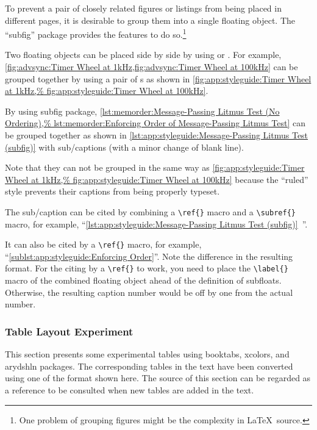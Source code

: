 To prevent a pair of closely related figures or listings
from being placed in different pages, it is desirable to group
them into a single floating object.
The ``subfig'' package provides the features to do so.\footnote{
  One problem of grouping figures might be the complexity in
  \LaTeX\ source.}

Two floating objects can be placed side by side by using
\co{\\parbox} or .
For example,
\cref{fig:advsync:Timer Wheel at 1kHz,fig:advsync:Timer Wheel at 100kHz}
can be grouped together by using a pair of s
as shown in
\cref{fig:app:styleguide:Timer Wheel at 1kHz,%
fig:app:styleguide:Timer Wheel at 100kHz}.

By using subfig package,
\cref{lst:memorder:Message-Passing Litmus Test (No Ordering),%
lst:memorder:Enforcing Order of Message-Passing Litmus Test}
can be grouped together as shown in
\cref{lst:app:styleguide:Message-Passing Litmus Test (subfig)}
with sub\-/captions (with a minor change of blank line).

Note that they can not be grouped in the same way as
\cref{fig:app:styleguide:Timer Wheel at 1kHz,%
fig:app:styleguide:Timer Wheel at 100kHz}
because the ``ruled'' style prevents their captions
from being properly typeset.

The sub\-/caption can be cited by combining a \verb|\ref{}| macro
and a \verb|\subref{}| macro, for example,
``\cref{lst:app:styleguide:Message-Passing Litmus Test (subfig)}\,%
''.

It can also be cited by a \verb|\ref{}| macro, for example,
``\cref{sublst:app:styleguide:Enforcing Order}''.
Note the difference in the resulting format.
For the citing by a \verb|\ref{}| to work, you need to place
the \verb|\label{}| macro of the combined floating object
ahead of the definition of subfloats.
Otherwise, the resulting caption number would be off by one
from the actual number.

\subsubsection{Table Layout Experiment}
\label{sec:app:styleguide:Table Layout Experiment}

This section presents some experimental tables
using booktabs, xcolors, and arydshln packages.
The corresponding tables in the text have been converted using one of
the format shown here.
The source of this section can be regarded as a reference to be
consulted when new tables are added in the text.

